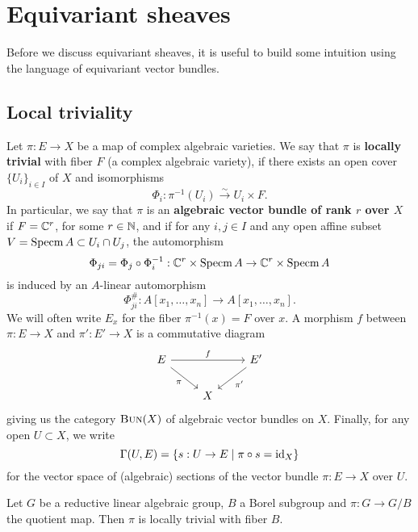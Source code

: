 \section{Equivariant sheaves}

Before we discuss equivariant sheaves, it is useful to build some intuition using
the language of equivariant vector bundles.

\subsection{Local triviality}

\begin{definition}
    Let $\pi:E\to X$ be a map of complex algebraic varieties. We say that $\pi$ is \textbf{locally trivial}
    with fiber $F$ (a complex algebraic variety), if there exists an open cover $\{U_i\}_{i\in I}$ of $X$ and isomorphisms
    \[\Phi_i:\pi^{-1}(U_i)\xrightarrow{\sim} U_i\times F.\]
    In particular, we say that $\pi$ is an \textbf{algebraic vector bundle of rank $r$ over $X$}
    if $F=\mathbb{C}^r$, for some $r\in\mathbb{N}$,
    and if for any $i,j\in I$ and any open affine subset $V=\operatorname{Specm} A\subset U_i\cap U_j$, the automorphism
    \[\Phi_{ji}=\Phi_j\circ\Phi_i^{-1}:\mathbb{C}^r\times \operatorname{Specm} A\to\mathbb{C}^r\times \operatorname{Specm} A\]
    is induced by an $A$-linear automorphism 
    \[\Phi_{ji}^\#: A[x_1,\ldots,x_n]\to A[x_1,\ldots,x_n].\]
    We will often write $E_x$ for the fiber $\pi^{-1}(x)=F$ over $x$. A morphism $f$ between $\pi:E\to X$
    and $\pi':E'\to X$ is a commutative diagram
    \begin{equation*}
        \begin{tikzcd}
            E\ar{rr}{f}\ar[swap]{rd}{\pi} & & E'\ar{ld}{\pi'}\\
            & X &
        \end{tikzcd}
    \end{equation*}
    giving us the category $\textsc{Bun}(X)$ of algebraic vector bundles on $X$.
    Finally, for any open $U\subset X$, we write
    \[\Gamma(U,E)= \{s:U\to E\mid \pi\circ s=\operatorname{id}_X\}\]
    for the vector space of (algebraic) sections of the vector bundle $\pi:E\to X$ over $U$.
\end{definition}

\begin{proposition}
    \label{prop:principalBbundle}
    Let $G$ be a reductive linear algebraic group, $B$ a Borel subgroup and $\pi : G \to G/B$ the quotient map. Then
    $\pi$ is locally trivial with fiber $B$.
\end{proposition}

